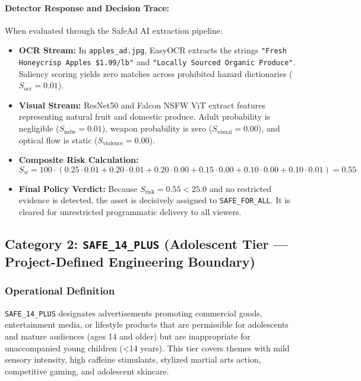\documentclass[12pt,a4paper]{report}
\begin{document}
\paragraph{Detector Response and Decision Trace:}
When evaluated through the SafeAd AI extraction pipeline:
\begin{itemize}
    \item \textbf{OCR Stream:} In \texttt{apples\_ad.jpg}, EasyOCR extracts the strings \texttt{"Fresh Honeycrisp Apples \$1.99/lb"} and \texttt{"Locally Sourced Organic Produce"}. Saliency scoring yields zero matches across prohibited hazard dictionaries ($S_{\text{ocr}} = 0.01$).
    \item \textbf{Visual Stream:} ResNet50 and Falcon NSFW ViT extract features representing natural fruit and domestic produce. Adult probability is negligible ($S_{\text{nsfw}} = 0.01$), weapon probability is zero ($S_{\text{visual}} = 0.00$), and optical flow is static ($S_{\text{violence}} = 0.00$).
    \item \textbf{Composite Risk Calculation:}
    \begin{equation}
    S_w = 100 \cdot (0.25 \cdot 0.01 + 0.20 \cdot 0.01 + 0.20 \cdot 0.00 + 0.15 \cdot 0.00 + 0.10 \cdot 0.00 + 0.10 \cdot 0.01) = 0.55
    \end{equation}
    \item \textbf{Final Policy Verdict:} Because $S_{\text{risk}} = 0.55 < 25.0$ and no restricted evidence is detected, the asset is decisively assigned to \texttt{SAFE\_FOR\_ALL}. It is cleared for unrestricted programmatic delivery to all viewers.
\end{itemize}

\subsection{Category 2: \texttt{SAFE\_14\_PLUS} (Adolescent Tier --- Project-Defined Engineering Boundary)}

\subsubsection{Operational Definition}
\texttt{SAFE\_14\_PLUS} designates advertisements promoting commercial goods, entertainment media, or lifestyle products that are permissible for adolescents and mature audiences (ages 14 and older) but are inappropriate for unaccompanied young children (<14 years). This tier covers themes with mild sensory intensity, high caffeine stimulants, stylized martial arts action, competitive gaming, and adolescent skincare.
\end{document}
